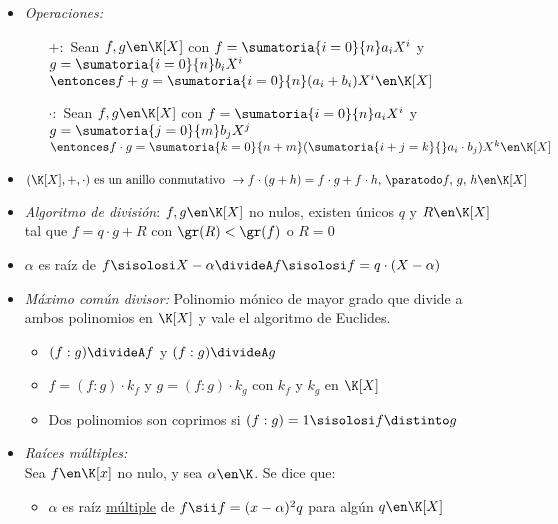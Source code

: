 \newcommand{\polGen}[1]{\sumatoria{i=0}{n} #1_i X^i}

\begin{itemize}
  \item \textit{Operaciones: }
        \begin{itemize}
          \item[$+:$] Sean $f,g \en \K[X]$ con $f = \polGen{a}$ y $g = \polGen{b}$\\
                $\entonces f + g = \sumatoria{i=0}{n} (a_i + b_i) X^i \en \K[X]$
          \item[$\cdot:$] Sean $f,g \en \K[X]$ con $f = \polGen{a}$ y $g = \sumatoria{j=0}{m} b_j X^j$\\
                $\entonces f \cdot g = \sumatoria{k=0}{n+m} (\sumatoria{i+j=k}{} a_i \cdot b_j) X^k \en \K[X]$
        \end{itemize}
  \item $(\K[X],+,\cdot) \text{ es un anillo conmutativo } \to f\cdot(g+h) = f\cdot g + f\cdot h,\, \paratodo f,\,g,\,h \en \K[X]$

  \item \textit{Algoritmo de división}: $f,g \en \K[X]$ no nulos, existen únicos $q$ y $R \en \K[X]$ tal que $f = q\cdot g + R$
        con $\gr(R) < \gr(f)$ o $R = 0$

  \item $\alpha$ es raíz de $f \sisolosi X - \alpha \divideA f \sisolosi f = q \cdot ( X - \alpha)$

  \item \textit{Máximo común divisor: } Polinomio mónico de mayor grado que divide a ambos polinomios en $\K[X]$
        y vale el algoritmo de Euclides.
        \begin{itemize}
          \item $(f:g) \divideA f$ y $(f:g) \divideA g$

          \item $f = (f:g)\cdot k_f$ y $g = (f:g)\cdot k_g$ con $k_f$ y $k_g$ en $\K[X]$

          \item Dos polinomios son coprimos si $(f:g) = 1 \sisolosi f \distinto g$
        \end{itemize}

  \item \textit{Raíces múltiples: }\\
        Sea $f \en \K[x]$ no nulo, y sea $\alpha \en \K$. Se dice que:
        \begin{itemize}
          \item $\alpha$ es raíz \underline{múltiple} de $f \sii f = (x - \alpha)^2 q$ para algún $q \en \K[X]$


\end{itemize}
\end{itemize}

